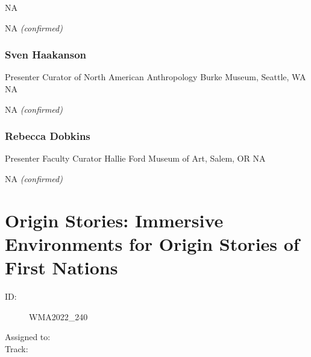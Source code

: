 \documentclass{report}
\begin{document}
                NA\newline

                NA\newline
                \emph{ (confirmed) }
              

              
                \subsubsection*{ Sven  Haakanson   }
                Presenter\newline
                Curator of North American Anthropology\newline
                Burke Museum, Seattle, WA
                \newline
                NA\newline
                
                

                NA
                \emph{ (confirmed) }
              

              
                \subsubsection*{ Rebecca  Dobkins  }
                Presenter\newline
                Faculty Curator\newline
                Hallie Ford Museum of Art, Salem, OR
                \newline
                NA\newline
                
                

                NA
                \emph{ (confirmed) }
              

              

              
        
          \newpage
          \section{ Origin Stories: Immersive Environments for Origin Stories of First Nations }
            \begin{description}
              \item [ID:]
              WMA2022\_240

              \item [Assigned to:]
                \item [Track:]
              \end{description}
\end{document}
